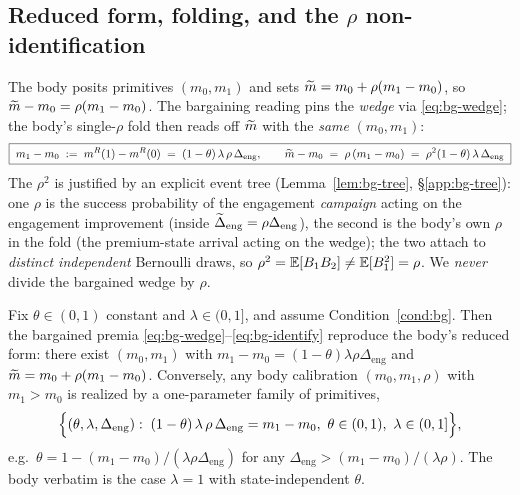 \subsection{Reduced form, folding, and the \texorpdfstring{$\rho$}{rho} non-identification}
\label{app:bg-reduced}

The body posits primitives $(m_{0},m_{1})$ and sets
$\widetilde{m}=m_{0}+\rho(m_{1}-m_{0})$, so $\widetilde{m}-m_{0}=\rho(m_{1}-m_{0})$. The
bargaining reading pins the \emph{wedge} via \eqref{eq:bg-wedge}; the body's
single-$\rho$ fold then reads off $\widetilde{m}$ with the \emph{same} $(m_{0},m_{1})$:
\begin{equation}
  \label{eq:bg-identify}
  \boxed{\;m_{1}-m_{0}\;:=\;m^{R}(1)-m^{R}(0)\;=\;(1-\theta)\,\lambda\,\rho\,\Delta_{\mathrm{eng}},
  \qquad
  \widetilde{m}-m_{0}\;=\;\rho\,(m_{1}-m_{0})\;=\;\rho^{2}(1-\theta)\,\lambda\,\Delta_{\mathrm{eng}}\;}
\end{equation}
The $\rho^{2}$ is justified by an explicit event tree
(Lemma~\ref{lem:bg-tree}, \S\ref{app:bg-tree}): one $\rho$ is the success
probability of the engagement \emph{campaign} acting on the engagement
improvement (inside $\widetilde{\Delta}_{\mathrm{eng}}=\rho\Delta_{\mathrm{eng}}$), the second
is the body's own $\rho$ in the fold (the premium-state arrival acting on the
wedge); the two attach to \emph{distinct independent} Bernoulli draws, so
$\rho^{2}=\mathbb{E}[B_{1}B_{2}]\ne\mathbb{E}[B_{1}^{2}]=\rho$. We \emph{never} divide the
bargained wedge by $\rho$.

\begin{proposition}
\label{prop:bg-reduced}
Fix $\theta\in(0,1)$ constant and $\lambda\in(0,1]$, and assume
Condition~\ref{cond:bg}. Then the bargained premia
\eqref{eq:bg-wedge}--\eqref{eq:bg-identify} reproduce the body's reduced form:
there exist $(m_{0},m_{1})$ with
$m_{1}-m_{0}=(1-\theta)\lambda\rho\Delta_{\mathrm{eng}}$ and
$\widetilde{m}=m_{0}+\rho(m_{1}-m_{0})$. Conversely, any body calibration
$(m_{0},m_{1},\rho)$ with $m_{1}>m_{0}$ is realized by a one-parameter family of
primitives,
\begin{equation}
  \label{eq:bg-locus}
  \Bigl\{(\theta,\lambda,\Delta_{\mathrm{eng}}):\;
    (1-\theta)\,\lambda\,\rho\,\Delta_{\mathrm{eng}}=m_{1}-m_{0},\ \theta\in(0,1),\ \lambda\in(0,1]\Bigr\},
\end{equation}
e.g.\ $\theta=1-(m_{1}-m_{0})/(\lambda\rho\Delta_{\mathrm{eng}})$ for any
$\Delta_{\mathrm{eng}}>(m_{1}-m_{0})/(\lambda\rho)$. The body verbatim is the case
$\lambda=1$ with state-independent $\theta$.
\end{proposition}

